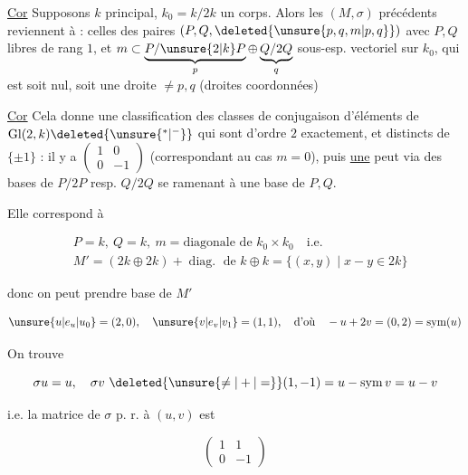 
\uline{Cor} Supposons $k$ principal,  $k_0=k/2k$ un corps. Alors les  $(M,\sigma)$ précédents reviennent à : celles des paires $(P,Q,\deleted{\unsure{p,q,m|p,q}})$ avec $P,Q$ libres de rang $1$, et  $m\subset\underbrace{P/\unsure{2|k}P}_{p}\oplus\underbrace{Q/2Q}_{q}$ sous-esp. vectoriel sur $k_0$,  qui est soit nul, soit une droite $\ne p,q$ (droites coordonnées)

\uline{Cor} Cela donne une classification des classes de conjugaison d'éléments de $\mathrm{Gl}(2,k)\deleted{\unsure{^*|^-}}$ qui sont d'ordre $2$ exactement, et distincts de $\{\pm1\}$ : il y  a  $\left(\begin{smallmatrix}1&0\\0&-1\end{smallmatrix}\right)$ (correspondant au cas $m=0$), puis \uline{une}   peut via des bases de $P/2P$ resp. $Q/2Q$ se ramenant à une base de $P,Q$.

Elle correspond à

\[
\begin{aligned}
&P=k,\ Q=k,\ m=\text{diagonale de }k_0\times k_0\quad\text{i.e.}\\
&M'=(2k\oplus2k)+\operatorname{diag.}\text{ de }k\oplus k=\{(x,y)\mid x-y\in2k\}
\end{aligned}
\]

donc on peut prendre base de $M'$

\[
\unsure{u|e_u|u_0}=(2,0),\quad\unsure{v|e_v|v_1}=(1,1),\quad\text{d'où}\quad -u+2v=(0,2)=\text{sym}(u)
\]


On trouve

\[
\sigma u=u,\quad \sigma v\ \deleted{\unsure{\ne|+|=}}(1,-1)=u-\mathrm{sym}\,v=u-v
\]

i.e. la matrice de $\sigma$ p. r. à $(u,v)$ est

\[
\begin{pmatrix}1&1\\0&-1\end{pmatrix}
\]

